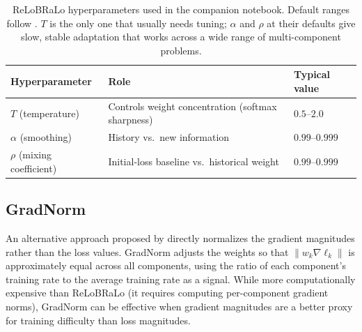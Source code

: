 \documentclass[11pt,a4paper]{report}
\begin{document}
\begin{table}[ht]
\centering
\small
\begin{tabular}{l l l}
\toprule
\textbf{Hyperparameter} & \textbf{Role} & \textbf{Typical value} \\
\midrule
$T$ (temperature) & Controls weight concentration (softmax sharpness) & $0.5$--$2.0$ \\
$\alpha$ (smoothing) & History vs.\ new information & $0.99$--$0.999$ \\
$\rho$ (mixing coefficient) & Initial-loss baseline vs.\ historical weight & $0.99$--$0.999$ \\
\bottomrule
\end{tabular}
\caption{ReLoBRaLo hyperparameters used in the companion notebook.  Default ranges follow \citet{bischof2025relobralo}.  $T$ is the only one that usually needs tuning; $\alpha$ and $\rho$ at their defaults give slow, stable adaptation that works across a wide range of multi-component problems.}
\label{tab:relobralo_hp}
\end{table}

\subsection{GradNorm}

An alternative approach proposed by \citet{chen2018gradnorm} directly normalizes the gradient magnitudes rather than the loss values.  GradNorm adjusts the weights so that $\|w_k \nabla \ell_k\|$ is approximately equal across all components, using the ratio of each component's training rate to the average training rate as a signal.  While more computationally expensive than ReLoBRaLo (it requires computing per-component gradient norms), GradNorm can be effective when gradient magnitudes are a better proxy for training difficulty than loss magnitudes.
\end{document}

